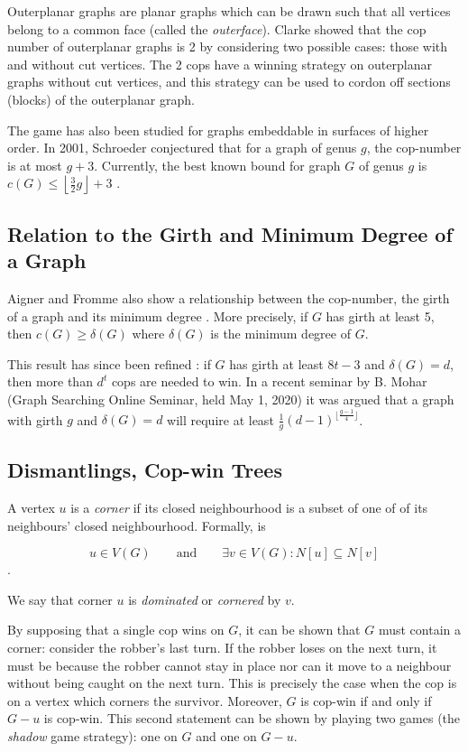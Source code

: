 Outerplanar graphs are planar graphs which can be drawn such that all vertices belong to a common face
(called the \textit{outerface}). Clarke \cite{clarke2002constrained} showed that the cop number of outerplanar graphs is 2 by considering
two possible cases: those with and without cut vertices. The 2 cops have a winning strategy on outerplanar graphs without cut vertices, and this strategy can be used to cordon off sections (blocks)
of the outerplanar graph.

The game has also been studied for graphs embeddable in surfaces of higher order.
In 2001, Schroeder conjectured \cite{bonato2017topological} that for a graph of genus $g$,
the cop-number is at most $g+3$. Currently, the best known bound for graph $G$ of genus $g$ is $c(G) \leq \left\lfloor \frac{3}{2}g \right\rfloor +3$ \cite{schroder2001copnumber}.

\subsection{Relation to the Girth and Minimum Degree of a Graph}

Aigner and Fromme also show a relationship between the cop-number, the girth of a graph and
its minimum degree \cite{aigner1984game}. More precisely, if $G$ has girth at least 5, then $c(G)\geq \delta(G)$ where $\delta(G)$ is the minimum degree of $G$.

This result has since been refined \cite{frankl1987cops}: if $G$ has girth at least $8t-3$ and $\delta(G) = d$, then more than $d^t$ cops are needed to win. In a recent
seminar by B. Mohar (Graph Searching Online Seminar, held May 1, 2020) it was
argued that a graph with girth $g$ and $\delta(G)=d$ will require at least $\tfrac{1}{g}(d-1)^{\lfloor \frac{g-1}{4} \rfloor}$.

\subsection{Dismantlings, Cop-win Trees \label{intro dismantlings}}

A vertex $u$ is a \textit{corner} if its closed neighbourhood
is a subset of one of of its neighbours' closed neighbourhood. Formally, is

\[u \in V(G) \qquad \text{and} \qquad \exists v\in V(G) : N[u] \subseteq N[v] \].

We say that corner $u$ is \textit{dominated} or \textit{cornered} by $v$.

By supposing that a single cop wins on $G$, it can be shown that $G$ must contain a corner: consider the robber's last turn. If the robber loses on the next turn, it must be because the robber cannot stay in place nor can it move to a neighbour without being caught on the next turn. This is precisely the case when the cop is on a vertex which corners the survivor. Moreover, $G$ is cop-win if and only if $G-u$ is cop-win. This second statement can be shown by playing two games (the \textit{shadow} game strategy): one on $G$ and one on $G-u$.

